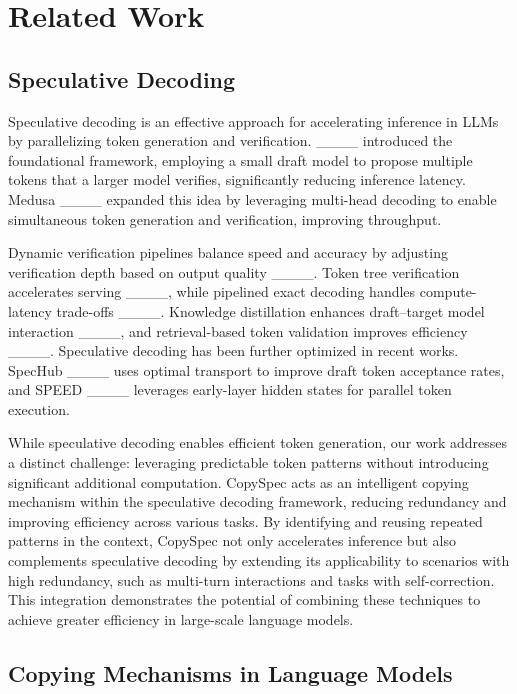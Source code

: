 \section{Related Work}
\subsection{Speculative Decoding}

Speculative decoding is an effective approach for accelerating inference in LLMs by parallelizing token generation and verification. ____ introduced the foundational framework, employing a small draft model to propose multiple tokens that a larger model verifies, significantly reducing inference latency. Medusa ____ expanded this idea by leveraging multi-head decoding to enable simultaneous token generation and verification, improving throughput. 

Dynamic verification pipelines balance speed and accuracy by adjusting verification depth based on output quality ____. Token tree verification accelerates serving ____, while pipelined exact decoding handles compute-latency trade-offs ____. Knowledge distillation enhances draft–target model interaction ____, and retrieval-based token validation improves efficiency ____. Speculative decoding has been further optimized in recent works. SpecHub ____ uses optimal transport to improve draft token acceptance rates, and SPEED ____ leverages early-layer hidden states for parallel token execution.

While speculative decoding enables efficient token generation, our work addresses a distinct challenge: leveraging predictable token patterns without introducing significant additional computation. CopySpec acts as an intelligent copying mechanism within the speculative decoding framework, reducing redundancy and improving efficiency across various tasks. By identifying and reusing repeated patterns in the context, CopySpec not only accelerates inference but also complements speculative decoding by extending its applicability to scenarios with high redundancy, such as multi-turn interactions and tasks with self-correction. This integration demonstrates the potential of combining these techniques to achieve greater efficiency in large-scale language models.

\subsection{Copying Mechanisms in Language Models}

